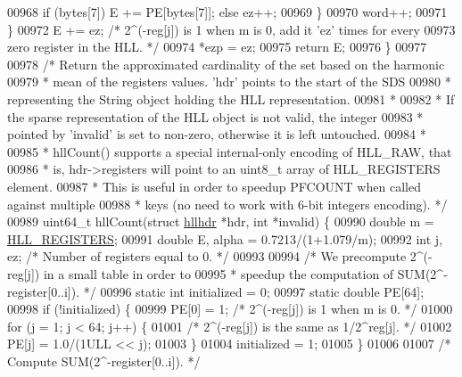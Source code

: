 \begin{DoxyCode}
{{00968             \textcolor{keywordflow}{if} (bytes[7]) E += PE[bytes[7]]; \textcolor{keywordflow}{else} ez++;
00969         \}
00970         word++;
00971     \}
00972     E += ez; \textcolor{comment}{/* 2^(-reg[j]) is 1 when m is 0, add it 'ez' times for every}
00973 \textcolor{comment}{                zero register in the HLL. */}
00974     *ezp = ez;
00975     \textcolor{keywordflow}{return} E;
00976 \}
00977 
00978 \textcolor{comment}{/* Return the approximated cardinality of the set based on the harmonic}
00979 \textcolor{comment}{ * mean of the registers values. 'hdr' points to the start of the SDS}
00980 \textcolor{comment}{ * representing the String object holding the HLL representation.}
00981 \textcolor{comment}{ *}
00982 \textcolor{comment}{ * If the sparse representation of the HLL object is not valid, the integer}
00983 \textcolor{comment}{ * pointed by 'invalid' is set to non-zero, otherwise it is left untouched.}
00984 \textcolor{comment}{ *}
00985 \textcolor{comment}{ * hllCount() supports a special internal-only encoding of HLL\_RAW, that}
00986 \textcolor{comment}{ * is, hdr->registers will point to an uint8\_t array of HLL\_REGISTERS element.}
00987 \textcolor{comment}{ * This is useful in order to speedup PFCOUNT when called against multiple}
00988 \textcolor{comment}{ * keys (no need to work with 6-bit integers encoding). */}
00989 uint64\_t hllCount(\textcolor{keyword}{struct} \hyperlink{structhllhdr}{hllhdr} *hdr, \textcolor{keywordtype}{int} *invalid) \{
00990     \textcolor{keywordtype}{double} m = \hyperlink{hyperloglog_8c_aa053beb90136828dcb46545c7445fc36}{HLL\_REGISTERS};
00991     \textcolor{keywordtype}{double} E, alpha = 0.7213/(1+1.079/m);
00992     \textcolor{keywordtype}{int} j, ez; \textcolor{comment}{/* Number of registers equal to 0. */}
00993 
00994     \textcolor{comment}{/* We precompute 2^(-reg[j]) in a small table in order to}
00995 \textcolor{comment}{     * speedup the computation of SUM(2^-register[0..i]). */}
00996     \textcolor{keyword}{static} \textcolor{keywordtype}{int} initialized = 0;
00997     \textcolor{keyword}{static} \textcolor{keywordtype}{double} PE[64];
00998     \textcolor{keywordflow}{if} (!initialized) \{
00999         PE[0] = 1; \textcolor{comment}{/* 2^(-reg[j]) is 1 when m is 0. */}
01000         \textcolor{keywordflow}{for} (j = 1; j < 64; j++) \{
01001             \textcolor{comment}{/* 2^(-reg[j]) is the same as 1/2^reg[j]. */}
01002             PE[j] = 1.0/(1ULL << j);
01003         \}
01004         initialized = 1;
01005     \}
01006 
01007     \textcolor{comment}{/* Compute SUM(2^-register[0..i]). */}
}}
\end{DoxyCode}
